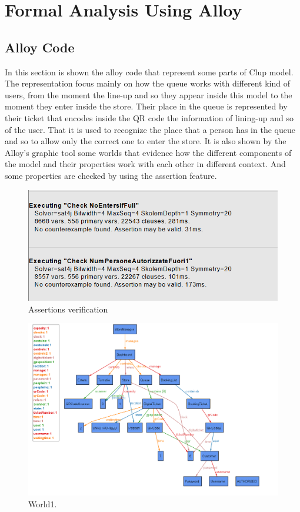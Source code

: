 \chapter{Formal Analysis Using Alloy}

\section{Alloy Code}

In this section is shown the alloy code that represent some parts of Clup model. The representation focus mainly on how the queue works with different kind of users, from the moment the line-up and so they appear inside this model to the moment they enter inside the store. Their place in the queue is represented by their ticket that encodes inside the QR code the information of lining-up and so of the user. That it is used to recognize the place that a person has in the queue and so to allow only the correct one to enter the store.
It is also shown by the Alloy’s graphic tool some worlds that evidence how the different components of the model and their properties work with each other in different context. And some properties are checked by using the assertion feature. 




\begin{figure}[H]
	\centering
	\includegraphics[width=\textwidth]{images/Assertions.png}
	\caption{Assertions verification}
	\label{figure: Assertions verification}
\end{figure}

\begin{figure}
	\includegraphics[width=1.0\textwidth]{images/AlloyW1.png}
	\caption{World1.}
	\label{figure: World1}
\end{figure}

